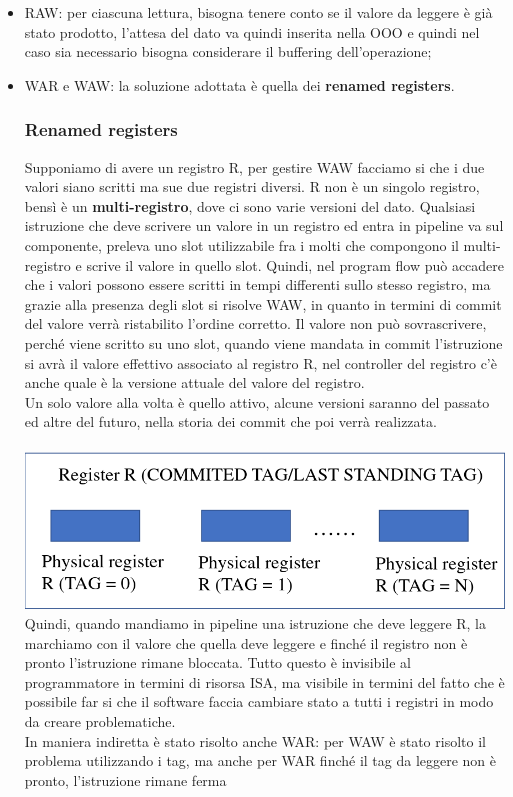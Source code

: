 \documentclass[14pt, oneside]{book}
\begin{document}
\begin{itemize}
\item RAW: per ciascuna lettura, bisogna tenere conto se il valore da leggere è già stato prodotto, l'attesa del dato va quindi inserita nella OOO e quindi nel caso sia necessario bisogna considerare il buffering dell'operazione;
\item WAR e WAW: la soluzione adottata è quella dei \textbf{renamed registers}. 
\subsubsection{Renamed registers}
Supponiamo di avere un registro R, per gestire WAW facciamo si che i due valori siano scritti ma sue due registri diversi. R non è un singolo registro, bensì è un \textbf{multi-registro}, dove ci sono varie versioni del dato. Qualsiasi istruzione che deve scrivere un valore in un registro ed entra in pipeline va sul componente, preleva uno slot utilizzabile fra i molti che compongono il multi-registro e scrive il valore in quello slot. Quindi, nel program flow può accadere che i valori possono essere scritti in tempi differenti sullo stesso registro, ma grazie alla presenza degli slot si risolve WAW, in quanto in termini di commit del valore verrà ristabilito l'ordine corretto. Il valore non può sovrascrivere, perché viene scritto su uno slot, quando viene mandata in commit l'istruzione si avrà il valore effettivo associato al registro R, nel controller del registro c'è anche quale è la versione attuale del valore del registro.\\ Un solo valore alla volta è quello attivo, alcune versioni saranno del passato ed altre del futuro, nella storia dei commit che poi verrà realizzata.\\\\
\includegraphics[scale=0.25]{immagini/multi-registri}\\
Quindi, quando mandiamo in pipeline una istruzione che deve leggere R, la marchiamo con il valore che quella deve leggere e finché il registro non è pronto l'istruzione rimane bloccata. Tutto questo è invisibile al programmatore in termini di risorsa ISA, ma visibile in termini del fatto che è possibile far si che il software faccia cambiare stato a tutti i registri in modo da creare problematiche.\\ In maniera indiretta è stato risolto anche WAR: per WAW è stato risolto il problema utilizzando i tag, ma anche per WAR finché il tag da leggere non è pronto, l'istruzione rimane ferma
\end{itemize}
\end{document}
